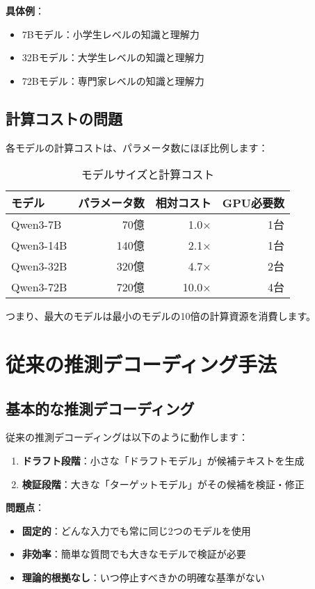 \documentclass[a4paper,12pt]{jsarticle}
\begin{document}
\textbf{具体例}：
\begin{itemize}
\item 7Bモデル：小学生レベルの知識と理解力
\item 32Bモデル：大学生レベルの知識と理解力  
\item 72Bモデル：専門家レベルの知識と理解力
\end{itemize}

\subsection{計算コストの問題}

各モデルの計算コストは、パラメータ数にほぼ比例します：

\begin{table}[H]
\centering
\caption{モデルサイズと計算コスト}
\begin{tabular}{|l|r|r|r|}
\hline
\textbf{モデル} & \textbf{パラメータ数} & \textbf{相対コスト} & \textbf{GPU必要数} \\
\hline
Qwen3-7B & 70億 & 1.0× & 1台 \\
Qwen3-14B & 140億 & 2.1× & 1台 \\
Qwen3-32B & 320億 & 4.7× & 2台 \\
Qwen3-72B & 720億 & 10.0× & 4台 \\
\hline
\end{tabular}
\end{table}

つまり、最大のモデルは最小のモデルの10倍の計算資源を消費します。

\section{従来の推測デコーディング手法}

\subsection{基本的な推測デコーディング}

従来の推測デコーディングは以下のように動作します：

\begin{enumerate}
\item \textbf{ドラフト段階}：小さな「ドラフトモデル」が候補テキストを生成
\item \textbf{検証段階}：大きな「ターゲットモデル」がその候補を検証・修正
\end{enumerate}

\textbf{問題点}：
\begin{itemize}
\item \textbf{固定的}：どんな入力でも常に同じ2つのモデルを使用
\item \textbf{非効率}：簡単な質問でも大きなモデルで検証が必要
\item \textbf{理論的根拠なし}：いつ停止すべきかの明確な基準がない
\end{itemize}
\end{document}
